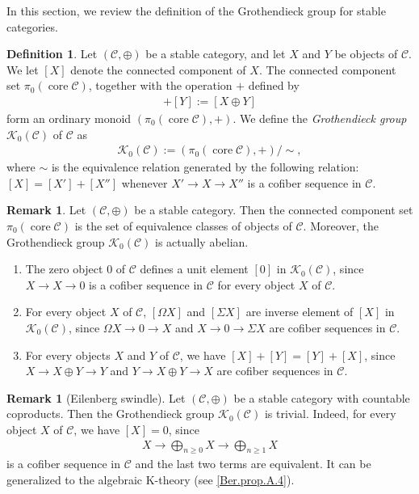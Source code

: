 \documentclass[a4paper,dvipdfmx,11pt,reqno]{amsart}
\newcommand{\C}{\mathcal{C}}
\newcommand{\K}{\mathcal{K}}
\DeclareMathOperator{\core}{core}
\theoremstyle{definition}
\newtheorem{definition}[theorem]{Definition}
\newtheorem{remark}[theorem]{Remark}
\begin{document}
In this section, we review the definition of the Grothendieck group for stable categories.

\begin{definition} \label{Ber.def.2.1}
  Let $(\C,\oplus)$ be a stable category, and let $X$ and $Y$ be objects of $\C$.
  We let $[X]$ denote the connected component of $X$.
  The connected component set $\pi_0(\core\C)$, together with the operation $+$ defined by 
  \begin{align*}
    [X] + [Y] := [X \oplus Y]
  \end{align*}
  form an ordinary monoid $(\pi_0(\core\C),+)$.
  We define the \textit{Grothendieck group} $\K_0(\C)$ of $\C$ as 
  \begin{align*}
    \K_0(\C) := (\pi_0(\core\C),+) / \sim,
  \end{align*}
  where $\sim$ is the equivalence relation generated by the following relation:
  $[X]=[X']+[X'']$ whenever $X' \to X \to X''$ is a cofiber sequence in $\C$.
\end{definition}

\begin{remark} \label{Ber.rem.2.2}
  Let $(\C,\oplus)$ be a stable category.
  Then the connected component set $\pi_0(\core\C)$ is the set of equivalence classes of objects of $\C$.
  Moreover, the Grothendieck group $\K_0(\C)$ is actually abelian.
  \begin{enumerate}
    \item The zero object $0$ of $\C$ defines a unit element $[0]$ in $\K_0(\C)$, since $X \to X \to 0$ is a cofiber sequence in $\C$ for every object $X$ of $\C$.
    \item For every object $X$ of $\C$, $[\Omega X]$ and $[\Sigma X]$ are inverse element of $[X]$ in $\K_0(\C)$, since $\Omega X \to 0 \to X$ and $X \to 0 \to \Sigma X$ are cofiber sequences in $\C$.
    \item For every objects $X$ and $Y$ of $\C$, we have $[X]+[Y]=[Y]+[X]$, since $X \to X \oplus Y \to Y$ and $Y \to X \oplus Y \to X$ are cofiber sequences in $\C$.
  \end{enumerate}
\end{remark}

\begin{remark}[Eilenberg swindle]
  Let $(\C,\oplus)$ be a stable category with countable coproducts.
  Then the Grothendieck group $\K_0(\C)$ is trivial.
  Indeed, for every object $X$ of $\C$, we have $[X] = 0$, since
  \begin{align*}
    X \to \bigoplus_{n \geq 0} X \to \bigoplus_{n \geq 1} X
  \end{align*}
  is a cofiber sequence in $\C$ and the last two terms are equivalent.
  It can be generalized to the algebraic K-theory (see \cref{Ber.prop.A.4}).
\end{remark}
\end{document}
